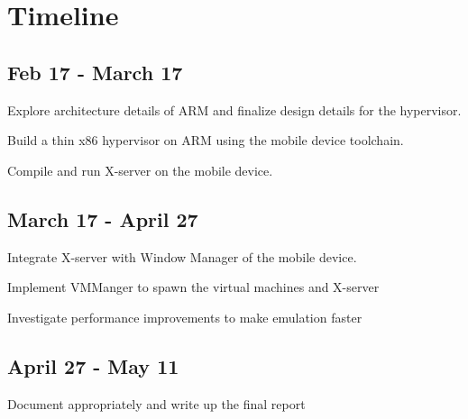 \section{Timeline}
\subsection{Feb 17 - March 17}
	\begin{itemize*}
	\item Explore architecture details of ARM and finalize design details for the hypervisor.
	\item Build a thin x86 hypervisor on ARM using the mobile device toolchain.
	\item Compile and run X-server on the mobile device.
	\end{itemize*}
\subsection{March 17 - April 27}
	\begin{itemize*}
	\item Integrate X-server with Window Manager of the mobile device.
	\item Implement VMManger to spawn the virtual machines and X-server 
	\item Investigate performance improvements to make emulation faster
	\end{itemize*}
\subsection{April 27 - May 11}
	\begin{itemize*}
	\item Document appropriately and write up the final report 
	\end{itemize*}
